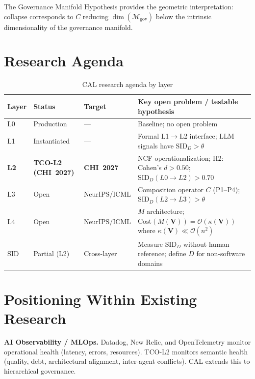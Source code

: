 \documentclass[11pt]{article}
\theoremstyle{definition}
\theoremstyle{remark}
\begin{document}
The Governance Manifold Hypothesis provides the geometric
interpretation: collapse corresponds to $C$ reducing
$\dim(\mathcal{M}_{\mathrm{gov}})$ below the intrinsic
dimensionality of the governance manifold.

\section{Research Agenda}

\begin{table}[h]
\centering
\caption{CAL research agenda by layer}
\label{tab:agenda}
\renewcommand{\arraystretch}{1.2}
\begin{tabularx}{\textwidth}{@{}lllX@{}}
\toprule
\textbf{Layer} & \textbf{Status} & \textbf{Target} &
  \textbf{Key open problem / testable hypothesis} \\
\midrule
L0 & Production & --- &
  Baseline; no open problem \\
L1 & Instantiated & --- &
  Formal L1$\to$L2 interface; LLM signals have $\text{SID}_D > \theta$ \\
\textbf{L2} & \textbf{TCO-L2 (CHI~2027)} & \textbf{CHI~2027} &
  NCF operationalization; H2: Cohen's $d > 0.50$;
  $\text{SID}_D(L0{\to}L2) > 0.70$ \\
L3 & Open & NeurIPS/ICML &
  Composition operator $C$ (P1--P4);
  $\text{SID}_D(L2{\to}L3) > \theta$ \\
L4 & Open & NeurIPS/ICML &
  $M$ architecture; $\text{Cost}(M(\mathbf{V})) = \mathcal{O}(\kappa(\mathbf{V}))$
  where $\kappa(\mathbf{V}) \ll \mathcal{O}(n^2)$ \\
SID & Partial (L2) & Cross-layer &
  Measure $\text{SID}_D$ without human reference; define $D$ for
  non-software domains \\
\bottomrule
\end{tabularx}
\end{table}

\section{Positioning Within Existing Research}

\textbf{AI Observability / MLOps.} Datadog, New Relic, and
OpenTelemetry monitor operational health (latency, errors,
resources). TCO-L2 monitors semantic health (quality, debt,
architectural alignment, inter-agent conflicts). CAL extends this to
hierarchical governance.
\end{document}
